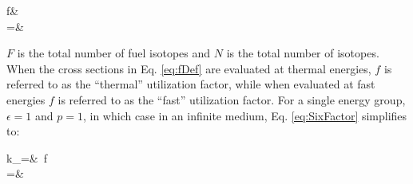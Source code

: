  \beqa
 \label{eq:fDef}
 f\equiv&\ \\
 =&\ 
 \eeqa
 
\(F\) is the total number of fuel isotopes and \(N\) is the total number of isotopes. When the cross sections in Eq. \eqref{eq:fDef} are evaluated at thermal energies, \(f\) is referred to as the ``thermal'' utilization factor, while when evaluated at fast energies \(f\) is referred to as the ``fast'' utilization factor. For a single energy group, \(\epsilon=1\) and \(p=1\), in which case in an infinite medium, Eq. \eqref{eq:SixFactor} simplifies to:

\beqa
\label{eq:InfKOneGroup}
k_\infty=&\ \eta f\\
=&\ 
\eeqa
 

